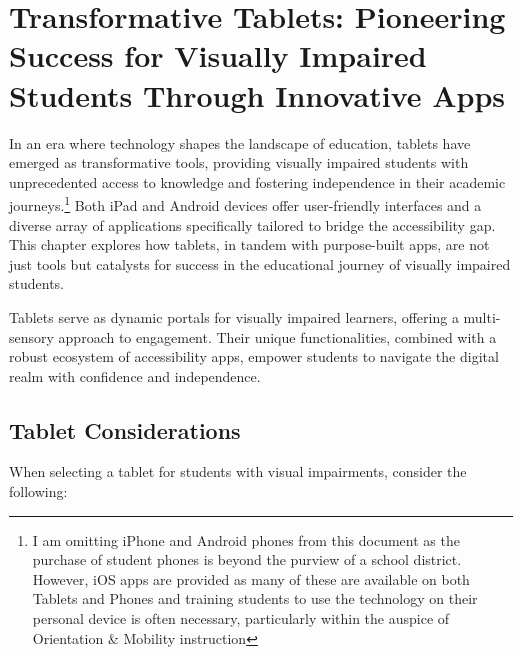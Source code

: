 \chapter{Transformative Tablets: Pioneering Success for Visually Impaired Students Through Innovative Apps}\label{ios-devices}

In an era where technology shapes the landscape of education, tablets have emerged as transformative tools, providing visually impaired students with unprecedented access to knowledge and fostering independence in their academic journeys.\footnote{I am omitting iPhone and Android phones from this document as the purchase of student phones is beyond the purview of a school district. However, iOS apps are provided as many of these are available on both Tablets and Phones and training students to use the technology on their personal device is often necessary, particularly within the auspice of Orientation \& Mobility instruction} Both iPad and Android devices offer user-friendly interfaces and a diverse array of applications specifically tailored to bridge the accessibility gap. This chapter explores how tablets, in tandem with purpose-built apps, are not just tools but catalysts for success in the educational journey of visually impaired students.

Tablets serve as dynamic portals for visually impaired learners, offering a multi-sensory approach to engagement. Their unique functionalities, combined with a robust ecosystem of accessibility apps, empower students to navigate the digital realm with confidence and independence.

\section{Tablet Considerations}\label{tablet-considerations}

When selecting a tablet for students with visual impairments, consider the following:

